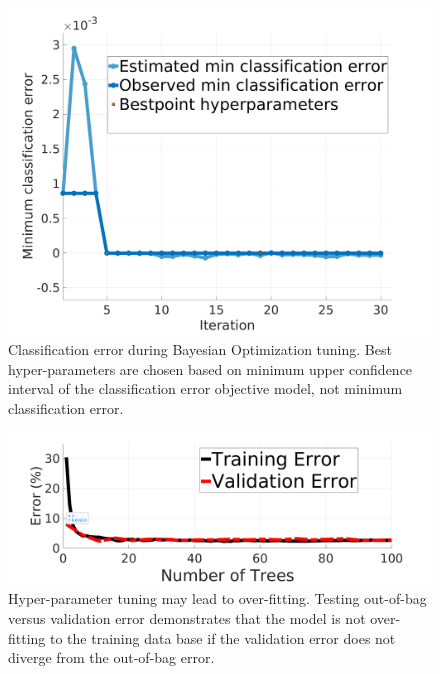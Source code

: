 \documentclass[journal,onecolumn]{IEEEtran}
\begin{document}
			\begin{figure}[H]
				\centering
				\includegraphics[width=0.75\linewidth]{figures/c2_min_class_error_2}
				\caption[RDF Training Classification Error]{Classification error during Bayesian Optimization tuning. Best hyper-parameters are chosen based on minimum upper confidence interval of the classification error objective model, not minimum classification error.}
				\label{fig:c2_min_class_error}
			\end{figure}

			\begin{figure}[H]
				\centering
				\includegraphics[width=0.75\linewidth]{figures/train_vs_valid_overfit_test_2}
				\caption[Training vs Validation Error]{Hyper-parameter tuning may lead to over-fitting. Testing out-of-bag versus validation error demonstrates that the model is not over-fitting to the training data base if the validation error does not diverge from the out-of-bag error.}
				\label{fig:train_vs_valid_overfit_test2}
			\end{figure}

\end{document}
